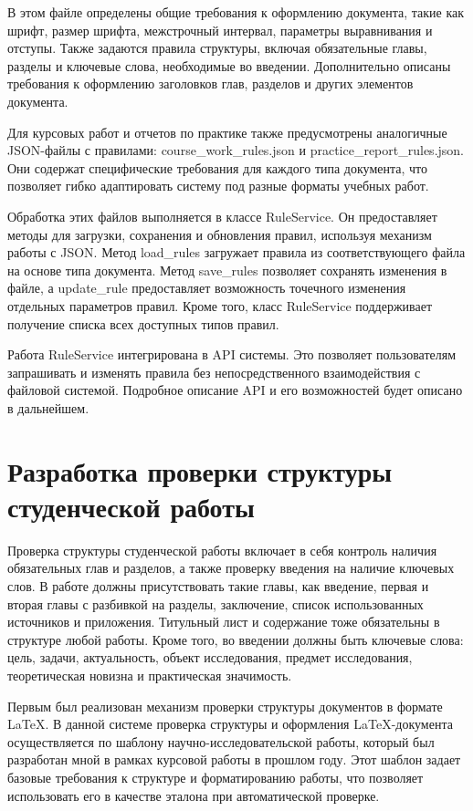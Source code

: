\documentclass{report}
\begin{document}
В этом файле определены общие требования к оформлению документа, такие как шрифт, размер шрифта, межстрочный интервал, параметры выравнивания и отступы. Также задаются правила структуры, включая обязательные главы, разделы и ключевые слова, необходимые во введении. Дополнительно описаны требования к оформлению заголовков глав, разделов и других элементов документа.

Для курсовых работ и отчетов по практике также предусмотрены аналогичные JSON-файлы с правилами: course\_work\_rules.json и practice\_report\_rules.json. Они содержат специфические требования для каждого типа документа, что позволяет гибко адаптировать систему под разные форматы учебных работ.

Обработка этих файлов выполняется в классе RuleService. Он предоставляет методы для загрузки, сохранения и обновления правил, используя механизм работы с JSON. Метод load\_rules загружает правила из соответствующего файла на основе типа документа. Метод save\_rules позволяет сохранять изменения в файле, а update\_rule предоставляет возможность точечного изменения отдельных параметров правил. Кроме того, класс RuleService поддерживает получение списка всех доступных типов правил.

Работа RuleService интегрирована в API системы. Это позволяет пользователям запрашивать и изменять правила без непосредственного взаимодействия с файловой системой. Подробное описание API и его возможностей будет описано в дальнейшем.

\section{Разработка проверки структуры студенческой работы}

Проверка структуры студенческой работы включает в себя контроль наличия обязательных глав и разделов, а также проверку введения на наличие ключевых слов. В работе должны присутствовать такие главы, как введение, первая и вторая главы с разбивкой на разделы, заключение, список использованных источников и приложения. Титульный лист и содержание тоже обязательны в структуре любой работы. Кроме того, во введении должны быть ключевые слова: цель, задачи, актуальность, объект исследования, предмет исследования, теоретическая новизна и практическая значимость.

Первым был реализован механизм проверки структуры документов в формате LaTeX. В данной системе проверка структуры и оформления LaTeX-документа осуществляется по шаблону научно-исследовательской работы, который был разработан мной в рамках курсовой работы в прошлом году. Этот шаблон задает базовые требования к структуре и форматированию работы, что позволяет использовать его в качестве эталона при автоматической проверке.
\end{document}
